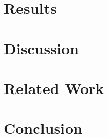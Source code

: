 \documentclass[smallextended]{svjour3}       %
\begin{document}
\section{Results}


\section{Discussion}


\section{Related Work}


\section{Conclusion}





%
%



\end{document}
